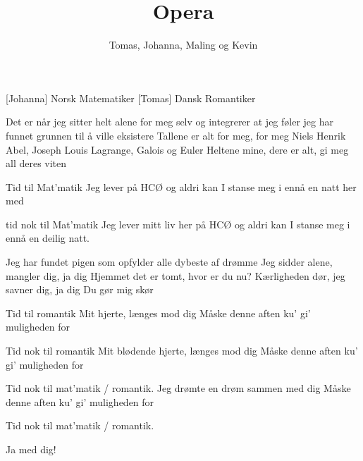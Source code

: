 \documentclass[a4paper,11pt]{article}
\title{Opera}
\author{Tomas, Johanna, Maling og Kevin}
\begin{document}
  \maketitle

  \begin{roles}
    [Johanna] Norsk Matematiker
    [Tomas] Dansk Romantiker
  \end{roles}

  \begin{song}
Det er når jeg sitter helt alene for meg selv og integrerer
at jeg føler jeg har funnet grunnen til å ville eksistere
Tallene er alt for meg, for meg
Niels Henrik Abel, Joseph Louis Lagrange, Galois og Euler
Heltene mine, dere er alt, gi meg all deres viten


Tid til Mat'matik
Jeg lever på HCØ
og aldri kan I stanse meg i
ennå en natt her med

tid nok til Mat'matik
Jeg lever mitt liv her på HCØ
og aldri kan I stanse meg i 
ennå en deilig natt.

Jeg har fundet pigen som opfylder alle dybeste af drømme
Jeg sidder alene, mangler dig, ja dig
Hjemmet det er tomt, hvor er du nu?
Kærligheden dør, jeg savner dig, ja dig
Du gør mig skør

Tid til romantik
Mit hjerte, længes mod dig
Måske denne aften ku' gi'
muligheden for

Tid nok til romantik
Mit blødende hjerte, længes mod dig
Måske denne aften ku' gi'
muligheden for
 
Tid nok til mat'matik / romantik.
Jeg drømte en drøm sammen med dig
Måske denne aften ku' gi'
muligheden for

Tid nok til mat'matik / romantik.

Ja med dig!
  \end{song}
\end{document}
